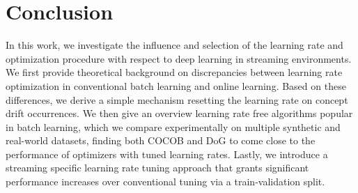 \documentclass[runningheads]{llncs}
\begin{document}




\section{Conclusion}

In this work, we investigate the influence and selection of the learning rate and optimization procedure with respect to deep learning in streaming environments.
We first provide theoretical background on discrepancies between learning rate optimization in conventional batch learning and online learning.
Based on these differences, we derive a simple mechanism resetting the learning rate on concept drift occurrences.
We then give an overview learning rate free algorithms popular in batch learning, which we compare experimentally on multiple synthetic and real-world datasets,
finding both COCOB and DoG to come close to the performance of optimizers with tuned learning rates.
Lastly, we introduce a streaming specific learning rate tuning approach that grants significant performance increases over conventional tuning via a train-validation split.


\printbibliography
\end{document}
